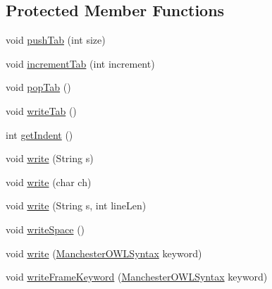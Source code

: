 \subsection*{Protected Member Functions}
\begin{DoxyCompactItemize}
\item 
void \hyperlink{classuk_1_1ac_1_1manchester_1_1cs_1_1owl_1_1owlapi_1_1mansyntaxrenderer_1_1_abstract_renderer_af0bace2ae3cb0a62809d60e45c6a129e}{push\-Tab} (int size)
\item 
void \hyperlink{classuk_1_1ac_1_1manchester_1_1cs_1_1owl_1_1owlapi_1_1mansyntaxrenderer_1_1_abstract_renderer_a403de6774ae76c7adccfaf0ecb53bfd0}{increment\-Tab} (int increment)
\item 
void \hyperlink{classuk_1_1ac_1_1manchester_1_1cs_1_1owl_1_1owlapi_1_1mansyntaxrenderer_1_1_abstract_renderer_a8d3338fa09ed453bb4306d75ab33a1d1}{pop\-Tab} ()
\item 
void \hyperlink{classuk_1_1ac_1_1manchester_1_1cs_1_1owl_1_1owlapi_1_1mansyntaxrenderer_1_1_abstract_renderer_a20e6a3df7c448e39ab2f18630a58a0d4}{write\-Tab} ()
\item 
int \hyperlink{classuk_1_1ac_1_1manchester_1_1cs_1_1owl_1_1owlapi_1_1mansyntaxrenderer_1_1_abstract_renderer_a38269fff1aa139973b87f81cc0e104b4}{get\-Indent} ()
\item 
void \hyperlink{classuk_1_1ac_1_1manchester_1_1cs_1_1owl_1_1owlapi_1_1mansyntaxrenderer_1_1_abstract_renderer_a5e57282d4394ea41d8328f5e9bc41ac6}{write} (String s)
\item 
void \hyperlink{classuk_1_1ac_1_1manchester_1_1cs_1_1owl_1_1owlapi_1_1mansyntaxrenderer_1_1_abstract_renderer_ae4f01b50e38abaf4a116010653eb8183}{write} (char ch)
\item 
void \hyperlink{classuk_1_1ac_1_1manchester_1_1cs_1_1owl_1_1owlapi_1_1mansyntaxrenderer_1_1_abstract_renderer_aa35feaa5ad9f7db864dcd54b0c4f2d40}{write} (String s, int line\-Len)
\item 
void \hyperlink{classuk_1_1ac_1_1manchester_1_1cs_1_1owl_1_1owlapi_1_1mansyntaxrenderer_1_1_abstract_renderer_a9468743a488d1b0e3455a7c040ebb4d1}{write\-Space} ()
\item 
void \hyperlink{classuk_1_1ac_1_1manchester_1_1cs_1_1owl_1_1owlapi_1_1mansyntaxrenderer_1_1_abstract_renderer_a8ac5b353d7195b73c2e700bf52a7b0c2}{write} (\hyperlink{enumorg_1_1coode_1_1owlapi_1_1manchesterowlsyntax_1_1_manchester_o_w_l_syntax}{Manchester\-O\-W\-L\-Syntax} keyword)
\item 
void \hyperlink{classuk_1_1ac_1_1manchester_1_1cs_1_1owl_1_1owlapi_1_1mansyntaxrenderer_1_1_abstract_renderer_abac747bf95d453f518347effd7ab3c65}{write\-Frame\-Keyword} (\hyperlink{enumorg_1_1coode_1_1owlapi_1_1manchesterowlsyntax_1_1_manchester_o_w_l_syntax}{Manchester\-O\-W\-L\-Syntax} keyword)

\end{DoxyCompactItemize}

